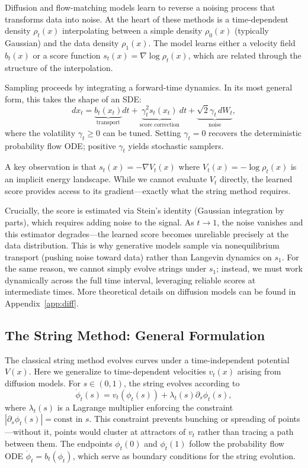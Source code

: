 \documentclass{article}
\theoremstyle{plain}
\theoremstyle{definition}
\theoremstyle{remark}
\begin{document}
Diffusion and flow-matching models learn to reverse a noising process that transforms data into noise. At the heart of these methods is a time-dependent density $\rho_t(x)$ interpolating between a simple density $\rho_0(x)$ (typically Gaussian) and the data density $\rho_1(x)$. The model learns either a velocity field $b_t(x)$ or a score function $s_t(x) = \nabla \log \rho_t(x)$, which are related through the structure of the interpolation.

Sampling proceeds by integrating a forward-time dynamics. In its most general form, this takes the shape of an SDE:
\begin{equation}
    dx_t = \underbrace{b_t(x_t)}_{\text{transport}} dt + \underbrace{\gamma_t^2 s_t(x_t)}_{\text{score correction}} dt + \underbrace{\sqrt{2}\gamma_t\, dW_t}_{\text{noise}},
    \label{eq:general_sde}
\end{equation}
where the volatility $\gamma_t \geq 0$ can be tuned. Setting $\gamma_t = 0$ recovers the deterministic probability flow ODE; positive $\gamma_t$ yields stochastic samplers.

A key observation is that $s_t(x) = -\nabla V_t(x)$ where $V_t(x) = -\log \rho_t(x)$ is an implicit energy landscape. While we cannot evaluate $V_t$ directly, the learned score provides access to its gradient---exactly what the string method requires.

Crucially, the score is estimated via Stein's identity (Gaussian integration by parts), which requires adding noise to the signal. As $t \to 1$, the noise vanishes and this estimator degrades---the learned score becomes unreliable precisely at the data distribution. This is why generative models sample via nonequilibrium transport (pushing noise toward data) rather than Langevin dynamics on $s_1$. For the same reason, we cannot simply evolve strings under $s_1$; instead, we must work dynamically across the full time interval, leveraging reliable scores at intermediate times. More theoretical details on diffusion models can be found in Appendix~\ref{app:diff}.

\subsection{The String Method: General Formulation}
\label{sec:string}

The classical string method \citep{e2002string, ren2007simplified} evolves curves under a time-independent potential $V(x)$. Here we generalize to time-dependent velocities $v_t(x)$ arising from diffusion models. For $s \in (0,1)$, the string evolves according to
\begin{equation}
    \dot{\phi}_t(s) = v_t(\phi_t(s)) + \lambda_t(s) \partial_s \phi_t(s),
    \label{eq:string_continuous}
\end{equation}
where $\lambda_t(s)$ is a Lagrange multiplier enforcing the constraint $|\partial_s \phi_t(s)| = \text{const}$ in $s$. This constraint prevents bunching or spreading of points---without it, points would cluster at attractors of $v_t$ rather than tracing a path between them. The endpoints $\phi_t(0)$ and $\phi_t(1)$ follow the probability flow ODE $\dot{\phi}_t = b_t(\phi_t)$, which serve as boundary conditions for the string evolution.
\end{document}
